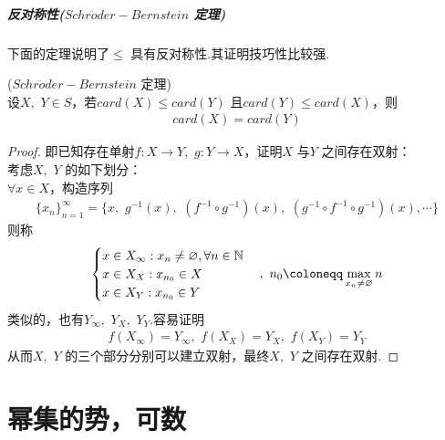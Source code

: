 	\vspace*{2em}
	\subparagraph{反对称性($Schr\ddot{o}der-Bernstein$ 定理)}
		下面的定理说明了$\leq$ 具有反对称性.其证明技巧性比较强.
		\begin{thm}\label{thm 1.6.3}
			($Schr\ddot{o}der-Bernstein$ 定理)\\
			设$X , \,\, Y \in S$，若$card(X) \leq card(Y)$ 且$card(Y) \leq card(X)$，则
			\begin{align}
				card(X) = card(Y)
			\end{align}
			\begin{proof}
				即已知存在单射$f : X \longrightarrow Y , \,\, g : Y \longrightarrow X$，证明$X$ 与$Y$ 之间存在双射：\\
				考虑$X , \,\, Y$ 的如下划分：\\
				$\forall x \in X$，构造序列
				\begin{align}
					\{ x_n \}_{n = 1}^{\infty} = \{ x , \,\, g^{-1}(x) , \,\, (f^{-1} \circ g^{-1})(x) , \,\, (g^{-1} \circ f^{-1} \circ g^{-1})(x) , \cdots \}
				\end{align}
				则称
				\begin{align}
					\begin{cases}
						x\in X_{\infty}:x_n\neq \varnothing ,\forall n\in \N\\
						x\in X_X:x_{n_0}\in X\\
						x\in X_Y:x_{n_0}\in Y\\
					\end{cases}, \,\, n_0 \coloneqq \max_{x_n \neq \varnothing}{n}
				\end{align}
				类似的，也有$Y_{\infty} , \,\, Y_X , \,\, Y_Y$.容易证明
				\begin{align}
					f(X_\infty) = Y_\infty , \,\, f(X_X) = Y_X , \,\, f(X_Y) = Y_Y
				\end{align}
				从而$X , \,\, Y$ 的三个部分分别可以建立双射，最终$X , \,\, Y$ 之间存在双射.
			\end{proof}
		\end{thm}
	
\newpage
\section{幂集的势，可数}
